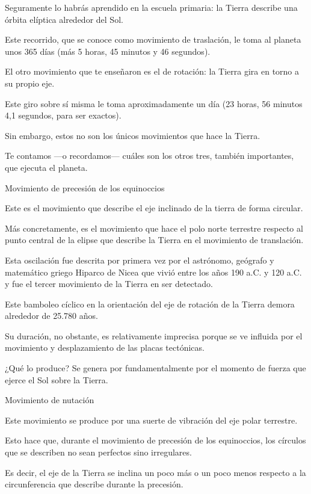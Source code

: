 \documentclass[12pt,a4paer]{article}
\begin{document}
Seguramente lo habrás aprendido en la escuela primaria: la Tierra describe una órbita elíptica alrededor del Sol.

Este recorrido, que se conoce como movimiento de traslación, le toma al planeta unos 365 días 
(más 5 horas, 45 minutos y 46 segundos).

El otro movimiento que te enseñaron es el de rotación: la Tierra gira en torno a su propio eje.

Este giro sobre sí misma le toma aproximadamente un día (23 horas, 56 minutos 4,1 segundos, para ser exactos). 

Sin embargo, estos no son los únicos movimientos que hace la Tierra.

Te contamos —o recordamos— cuáles son los otros tres, también importantes, que ejecuta el planeta.





Movimiento de precesión de los equinoccios

Este es el movimiento que describe el eje inclinado de la tierra de forma circular.

Más concretamente, es el movimiento que hace el polo norte terrestre respecto al punto central de la elipse 
que describe la Tierra en el movimiento de translación.

Esta oscilación fue descrita por primera vez por el astrónomo, geógrafo y matemático griego Hiparco de Nicea 
que vivió entre los años 190 a.C. y 120 a.C. y fue el tercer movimiento de la Tierra en ser detectado.

Este bamboleo cíclico en la orientación del eje de rotación de la Tierra demora alrededor de 25.780 años. 

Su duración, no obstante, es relativamente imprecisa porque se ve influida por el movimiento y desplazamiento 
de las placas tectónicas.

¿Qué lo produce? Se genera por fundamentalmente por el momento de fuerza que ejerce el Sol sobre la Tierra. 




Movimiento de nutación

Este movimiento se produce por una suerte de vibración del eje polar terrestre.

Esto hace que, durante el movimiento de precesión de los equinoccios, los círculos que se describen no sean 
perfectos sino irregulares.

Es decir, el eje de la Tierra se inclina un poco más o un poco menos respecto a la circunferencia que describe 
durante la precesión.
\end{document}
